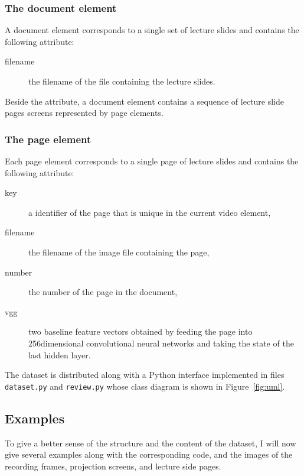 \subsubsection*{The document element}
A document element corresponds to a single set of lecture slides and contains
the following attribute:
\begin{description}
  \item[filename] the filename of the  file containing the lecture slides.
\end{description}
Beside the attribute, a document element contains a sequence of lecture slide
pages screens represented by page elements.

\subsubsection*{The page element}
Each page element corresponds to a single page of lecture slides and contains
the following attribute:
\begin{description}
  \item[key] a identifier of the page that is unique in the current video element,
  \item[filename] the filename of the image file containing the page,
  \item[number] the number of the page in the  document,
  \item[vgg] two baseline feature vectors obtained by feeding the
    page into 256dimensional  convolutional neural networks and
    taking the state of the last hidden layer.
\end{description}

The dataset is distributed along with a Python interface implemented in files
\texttt{dataset.py} and \texttt{review.py} whose class diagram is shown in
Figure~\ref{fig:uml}.

\subsection{Examples}
To give a better sense of the structure and the content of the dataset, I will
now give several examples along with the corresponding  code, and the
images of the recording frames, projection screens, and lecture side pages.

